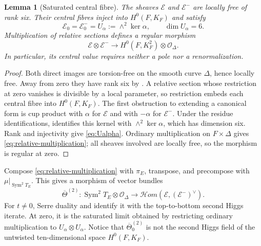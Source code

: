 \documentclass[11pt,reqno]{amsart}
\numberwithin{equation}{section}
\newtheorem{lemma}[theorem]{Lemma}
\theoremstyle{definition}
\theoremstyle{remark}
\newcommand{\OO}{\mathcal O}
\newcommand{\Sym}{\operatorname{Sym}}
\begin{document}
\begin{lemma}[Saturated central fibre]\label{lem:saturated-limit}
The sheaves $\mathscr E$ and $\mathscr E^-$ are locally free of rank six.  Their central fibres inject into $H^0(F,K_F)$ and satisfy
\begin{equation}\label{eq:Ualpha}
\mathscr E_0=\mathscr E^-_0
=U_\alpha:=\wedge^2\ker\alpha,
\qquad \dim U_\alpha=6.
\end{equation}
Multiplication of relative sections defines a regular morphism
\begin{equation}\label{eq:relative-multiplication}
\mathscr E\otimes\mathscr E^-
\longrightarrow H^0(F,K_F^2)\otimes\OO_\Delta.
\end{equation}
In particular, its central value requires neither a pole nor a renormalization.
\end{lemma}

\begin{proof}
Both direct images are torsion-free on the smooth curve $\Delta$, hence locally free.  Away from zero they have rank six by \cite[Lemma~3.3]{KLM2026}.  A relative section whose restriction at zero vanishes is divisible by a local parameter, so restriction embeds each central fibre into $H^0(F,K_F)$.  The first obstruction to extending a canonical form is cup product with $\alpha$ for $\mathscr E$ and with $-\alpha$ for $\mathscr E^-$.  Under the residue identifications, \cite[Lemma~3.4]{KLM2026} identifies this kernel with $\wedge^2\ker\alpha$, which has dimension six.  Rank and injectivity give \eqref{eq:Ualpha}.  Ordinary multiplication on $F\times\Delta$ gives \eqref{eq:relative-multiplication}; all sheaves involved are locally free, so the morphism is regular at zero.
\end{proof}

Compose \eqref{eq:relative-multiplication} with $\pi_E$, transpose, and precompose with $\mu|_{\Sym^2T_E}$.  This gives a morphism of vector bundles
\begin{equation}\label{eq:relative-second}
\overline\Theta^{(2)}:
\Sym^2T_E\otimes\OO_\Delta
\longrightarrow
\mathcal Hom(\mathscr E,(\mathscr E^-)^\vee).
\end{equation}
For $t\ne0$, Serre duality and \cite[Equation~(2.1)]{KLM2026} identify it with the top-to-bottom second Higgs iterate.  At zero, it is the saturated limit obtained by restricting ordinary multiplication to
$U_\alpha\otimes U_\alpha$.  Notice that
$\overline\Theta^{(2)}_0$ is not the second Higgs field of the untwisted ten-dimensional space $H^0(F,K_F)$.
\end{document}

